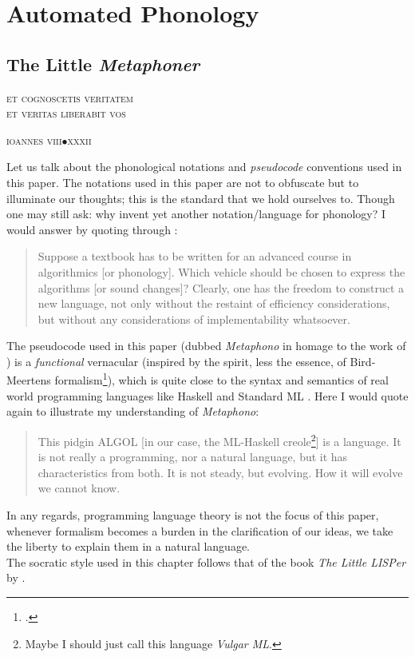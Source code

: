\documentclass{report}[12pt]
\begin{document}
\part{Automated Phonology}

\chapter{The Little \emph{Metaphoner}}

\epigraph{\textsc{et cognoscetis veritatem \\ et veritas liberabit vos}}{\textsc{ioannes viii}$\bullet$\textsc{xxxii}}

Let us talk about the phonological notations and \emph{pseudocode} conventions used in this paper. The notations used in this paper are not to obfuscate but to illuminate our thoughts; this is the standard that we hold ourselves to. Though one may still ask: why invent yet another notation/language for phonology? I would answer by quoting \cite{abstracto} through \cite[p.~14]{squiggol}:
\begin{quote}
  Suppose a textbook has to be written for an advanced course in algorithmics [or phonology]. Which vehicle should be chosen to express the algorithms [or sound changes]? Clearly, one has the freedom to construct a new language, not only without the restaint of efficiency considerations, but without any considerations of implementability whatsoever.
\end{quote}
The pseudocode used in this paper (dubbed \emph{Metaphono} in homage to the work of \cite{hartman_phono}) is a \emph{functional} vernacular (inspired by the spirit, less the essence, of Bird-Meertens formalism\footcite{bird_moor, squiggol, bird_meertens_book}), which is quite close to the syntax and semantics of real world programming languages like Haskell \parencite{haskell2010} and Standard ML \parencite{def_sml}. Here I would quote \cite[p.~57]{abstracto} again to illustrate my understanding of \emph{Metaphono}:
\begin{quote}
  This pidgin ALGOL [in our case, the ML-Haskell creole\footnote{Maybe I should just call this language \emph{Vulgar ML}.}] is a language. It is not really a programming, nor a natural language, but it has characteristics from both. It is not steady, but evolving. How it will evolve we cannot know.
\end{quote}
In any regards, programming language theory is not the focus of this paper, whenever formalism becomes a burden in the clarification of our ideas, we take the liberty to explain them in a natural language. \\
The socratic style used in this chapter follows that of the book \emph{The Little LISPer} by \cite{lisper}.
\end{document}
